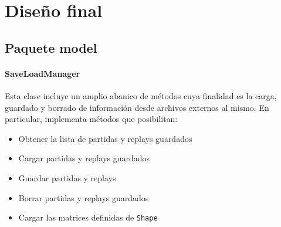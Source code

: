 \documentclass[../DocumentoOficial.tex]{subfiles}
\begin{document}
\chapter{Diseño final}

\section{Paquete model}

\subsubsection{SaveLoadManager}

Esta clase incluye un amplio abanico de métodos cuya finalidad es la carga, guardado y borrado de información desde archivos externos al mismo. En particular, implementa métodos que posibilitan:

\begin{itemize}
\item Obtener la lista de partidas y replays guardados
\item Cargar partidas y replays guardados
\item Guardar partidas y replays
\item Borrar partidas y replays guardados
\item Cargar las matrices definidas de \texttt{Shape}
\end{itemize}
\end{document}
